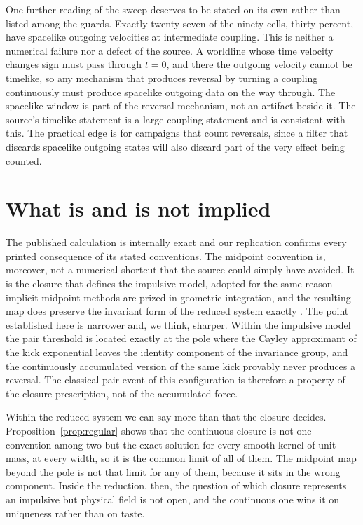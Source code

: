 \documentclass[aps,prd,reprint,nofootinbib]{revtex4-2}
\begin{document}
One further reading of the sweep deserves to be stated on its own
rather than listed among the guards.  Exactly twenty-seven of the
ninety cells, thirty percent, have spacelike outgoing velocities at
intermediate coupling.  This is neither a numerical failure nor a
defect of the source.  A worldline whose time velocity changes sign
must pass through $\dot t = 0$, and there the outgoing velocity cannot
be timelike, so any mechanism that produces reversal by turning a
coupling continuously must produce spacelike outgoing data on the way
through.  The spacelike window is part of the reversal mechanism, not
an artifact beside it.  The source's timelike statement is a
large-coupling statement and is consistent with this.  The practical
edge is for campaigns that count reversals, since a filter that
discards spacelike outgoing states will also discard part of the very
effect being counted.

\section{What is and is not implied}
\label{sec:scope}

The published calculation is internally exact and our replication
confirms every printed consequence of its stated conventions.  The
midpoint convention is, moreover, not a numerical shortcut that the
source could simply have avoided.  It is the closure that defines the
impulsive model, adopted for the same reason implicit midpoint methods
are prized in geometric integration, and the resulting map does
preserve the invariant form of the reduced system exactly
\cite{HairerLubichWanner}.  The point established here is narrower and,
we think, sharper.  Within the impulsive model the pair threshold is
located exactly at the pole where the Cayley approximant of the kick
exponential leaves the identity component of the invariance group, and
the continuously accumulated version of the same kick provably never
produces a reversal.  The classical pair event of this configuration is
therefore a property of the closure prescription, not of the
accumulated force.

Within the reduced system we can say more than that the closure
decides.  Proposition~\ref{prop:regular} shows that the continuous
closure is not one convention among two but the exact solution for
every smooth kernel of unit mass, at every width, so it is the common
limit of all of them.  The midpoint map beyond the pole is not that
limit for any of them, because it sits in the wrong component.  Inside
the reduction, then, the question of which closure represents an
impulsive but physical field is not open, and the continuous one wins
it on uniqueness rather than on taste.
\end{document}
